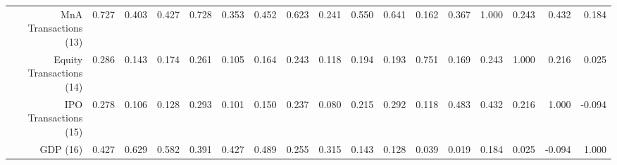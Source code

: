 \begin{table}[ht]
\begin{tabular}{rrrrrrrrrrrrrrrrr}
  MnA Transactions (13) & 0.727 & 0.403 & 0.427 & 0.728 & 0.353 & 0.452 & 0.623 & 0.241 & 0.550 & 0.641 & 0.162 & 0.367 & 1.000 & 0.243 & 0.432 & 0.184 \\ 
  Equity Transactions (14) & 0.286 & 0.143 & 0.174 & 0.261 & 0.105 & 0.164 & 0.243 & 0.118 & 0.194 & 0.193 & 0.751 & 0.169 & 0.243 & 1.000 & 0.216 & 0.025 \\ 
  IPO Transactions (15) & 0.278 & 0.106 & 0.128 & 0.293 & 0.101 & 0.150 & 0.237 & 0.080 & 0.215 & 0.292 & 0.118 & 0.483 & 0.432 & 0.216 & 1.000 & -0.094 \\ 
  GDP (16) & 0.427 & 0.629 & 0.582 & 0.391 & 0.427 & 0.489 & 0.255 & 0.315 & 0.143 & 0.128 & 0.039 & 0.019 & 0.184 & 0.025 & -0.094 & 1.000 \\ 
   \hline
\end{tabular}
\end{table}
